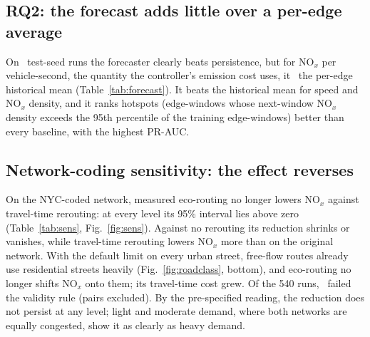 \documentclass[conference]{IEEEtran}
\begin{document}
\subsection{RQ2: the forecast adds little over a per-edge average}
On \TestRuns\ test-seed runs the forecaster clearly beats persistence, but for NO$_x$ per vehicle-second, the quantity
the controller's emission cost uses, it \ForecastVerdictR\ the per-edge historical mean (Table~\ref{tab:forecast}).
It beats the historical mean for speed and NO$_x$ density, and it ranks hotspots (edge-windows whose next-window NO$_x$
density exceeds the 95th percentile of the training edge-windows) better than every baseline, with the highest PR-AUC.

\begin{table}[t]
\centering\footnotesize
\caption{Forecast Accuracy on the Test Seeds: Mean Absolute Error, Hotspot PR-AUC, and Skill (1 $-$ MAE Ratio,
95\% Cluster-Bootstrap Interval over Runs)}
\label{tab:forecast}

\end{table}

\subsection{Network-coding sensitivity: the effect reverses}
On the NYC-coded network, measured eco-routing no longer lowers NO$_x$ against travel-time rerouting: at every level its
95\% interval lies above zero (Table~\ref{tab:sens}, Fig.~\ref{fig:sens}). Against no rerouting its reduction shrinks or
vanishes, while travel-time rerouting lowers NO$_x$ more than on the original network. With the default limit on every
urban street, free-flow routes already use residential streets heavily (Fig.~\ref{fig:roadclass}, bottom), and
eco-routing no longer shifts NO$_x$ onto them; its travel-time cost grew. Of the 540 runs, \SensInvalidRuns\ failed
the validity rule (pairs excluded). By the pre-specified reading, the reduction does not persist at any level; light
and moderate demand, where both networks are equally congested, show it as clearly as heavy demand.

\begin{table}[t]
\centering\footnotesize
\caption{Sensitivity Experiment: Change in Total NO$_x$ on the Network as Built (Confirmatory Runs) and on the
NYC-Coded Network, and Their Difference (NYC-Coded Minus As Built; Independent Samples, Percentile Bootstrap)}
\label{tab:sens}

\end{table}
\end{document}

